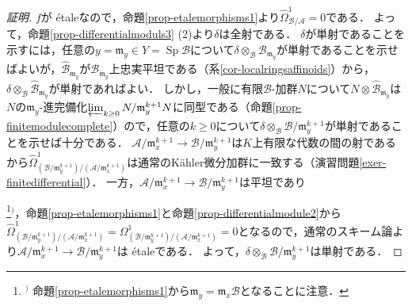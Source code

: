 \documentclass[a4paper,12pt, dvipdfmx]{jsbook}
\def\m{\mathfrak{m}}
\def\Sp{\mathop{\mathrm{Sp}}\nolimits}
\theoremstyle{plain}
\theoremstyle{definition}
\newcounter{chushaku}
\def\chu#1{\addtocounter{chushaku}{1}\footnote[\value{chushaku}]{${}^)$ #1}${}^)$}
\begin{document}
\begin{proof}[証明]
$f$が \'etaleなので，命題\ref{prop-etalemorphisms1}より$\widehat{\Omega}^1_{\mathcal{B}/\mathcal{A}}=0$である．
よって，命題\ref{prop-differentialmoduls3} (2)より$\delta$は全射である．
$\delta$が単射であることを示すには，任意の$y=\m_y\in Y=\Sp\mathcal{B}$について$\delta\otimes_{\mathcal{B}}\mathcal{B}_{\m_y}$が単射であることを示せばよいが，$\widehat{\mathcal{B}}_{\m_y}$が$\mathcal{B}_{\m_y}$上忠実平坦である（系\ref{cor-localringsaffinoids}）から，$\delta\otimes_{\mathcal{B}}\widehat{\mathcal{B}}_{\m_y}$が単射であればよい．
しかし，一般に有限$\mathcal{B}$-加群$N$について$N\otimes\widehat{\mathcal{B}}_{\m_y}$は$N$の$\m_y$-進完備化$\varprojlim_{k\geq 0}N/\m^{k+1}_yN$に同型である（命題\ref{prop-finitemodulecomplete}）ので，任意の$k\geq 0$について$\delta\otimes_{\mathcal{B}}\mathcal{B}/\m^{k+1}_y$が単射であることを示せば十分である．
$\mathcal{A}/\m^{k+1}_x\rightarrow\mathcal{B}/\m^{k+1}_y$は$K$上有限な代数の間の射であるから$\widehat{\Omega}^1_{(\mathcal{B}/\m^{k+1}_y)/(\mathcal{A}/\m^{k+1}_x)}$は通常のK\"ahler微分加群に一致する（演習問題\ref{exer-finitedifferential}）．
一方，$\mathcal{A}/\m^{k+1}_x\rightarrow\mathcal{B}/\m^{k+1}_y$は平坦であり\chu{命題\ref{prop-etalemorphisms1}から$\m_y=\m_x\mathcal{B}$となることに注意．}，命題\ref{prop-etalemorphisms1}と命題\ref{prop-differentialmodule2}から$\widehat{\Omega}^1_{(\mathcal{B}/\m^{k+1}_y)/(\mathcal{A}/\m^{k+1}_x)}=\Omega^1_{(\mathcal{B}/\m^{k+1}_y)/(\mathcal{A}/\m^{k+1}_x)}=0$となるので，通常のスキーム論より$\mathcal{A}/\m^{k+1}_x\rightarrow\mathcal{B}/\m^{k+1}_y$は \'etaleである．
よって，$\delta\otimes_{\mathcal{B}}\mathcal{B}/\m^{k+1}_y$は単射である．
\end{proof}
\end{document}
